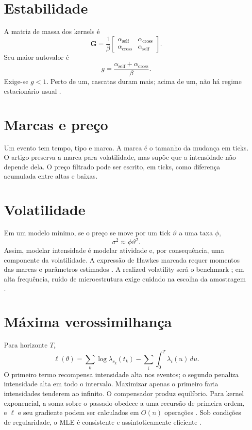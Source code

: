 \documentclass[12pt,a4paper,openany]{report}
\begin{document}
\section{Estabilidade}

A matriz de massa dos kernels é
\[
 \mathbf G=\frac{1}{\beta}
 \begin{bmatrix}
  \alpha_{\mathrm{self}} & \alpha_{\mathrm{cross}}\\
  \alpha_{\mathrm{cross}} & \alpha_{\mathrm{self}}
 \end{bmatrix}.
\]
Seu maior autovalor é
\[
 g=\frac{\alpha_{\mathrm{self}}+\alpha_{\mathrm{cross}}}{\beta}.
\]
Exige-se \(g<1\). Perto de um, cascatas duram mais; acima de um, não há regime
estacionário usual \citep{hardiman2013,filimonov2012}.

\section{Marcas e preço}

Um evento tem tempo, tipo e marca. A marca é o tamanho da mudança em ticks. O artigo
preserva a marca para volatilidade, mas supõe que a intensidade não depende dela. O
preço filtrado pode ser escrito, em ticks, como diferença acumulada entre altas e baixas.

\section{Volatilidade}

Em um modelo mínimo, se o preço se move por um tick \(\vartheta\) a uma taxa \(\phi\),
\[
 \sigma^2\approx\phi\vartheta^2.
\]
Assim, modelar intensidade é modelar atividade e, por consequência, uma componente da
volatilidade. A expressão de Hawkes marcada requer momentos das marcas e parâmetros
estimados \citep{leeseo2017,lee2024}. A realized volatility será o benchmark
\citep{andersen2003,barndorff2002}; em alta frequência, ruído de microestrutura exige
cuidado na escolha da amostragem \citep{zhang2005}.

\section{Máxima verossimilhança}

Para horizonte \(T\),
\[
 \ell(\theta)=\sum_k\log\lambda_{c_k}(t_k)
 -\sum_i\int_0^T\lambda_i(u)\,du.
\]
O primeiro termo recompensa intensidade alta nos eventos; o segundo penaliza intensidade
alta em todo o intervalo. Maximizar apenas o primeiro faria intensidades tenderem ao
infinito. O compensador produz equilíbrio. Para kernel exponencial, a soma sobre o
passado obedece a uma recursão de primeira ordem, e \(\ell\) e seu gradiente podem ser
calculados em \(O(n)\) operações \citep{ozaki1979}. Sob condições de regularidade, o
MLE é consistente e assintoticamente eficiente \citep{ogata1978}.
\end{document}
